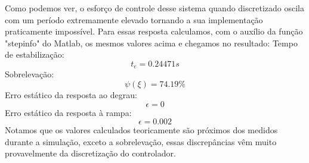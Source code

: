\documentclass{article}
\begin{document}
Como podemos ver, o esforço de controle desse sistema quando discretizado oscila com um período extremamente elevado tornando a sua implementação praticamente impossível. 
Para essas resposta calculamos, com o auxílio da função "stepinfo" do Matlab, os mesmos valores acima e chegamos no resultado:
		Tempo de estabilização:
		\begin{equation}
		t_{e} = 0.24471 s
		\end{equation}
		Sobrelevação:
		\begin{equation}
		\psi(\xi) = 74.19\%
		\end{equation}
		Erro estático da resposta ao degrau:
		\begin{equation}
		\epsilon = 0
		\end{equation}
		Erro estático da resposta à rampa:
		\begin{equation}
		\epsilon = 0.002
		\end{equation}
Notamos que os valores calculados teoricamente são próximos dos medidos durante a simulação, exceto a sobrelevação, essas discrepâncias vêm muito provavelmente da discretização do controlador.
\end{document}

